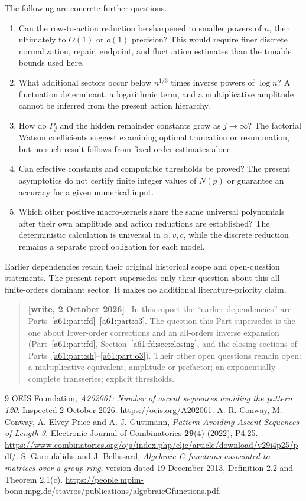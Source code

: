 \documentclass[11pt,letterpaper]{article}
\numberwithin{equation}{section}
\theoremstyle{remark}\newtheorem{remark}[theorem]{Remark}
\newenvironment{writenote}{\par\smallskip\begin{quote}\small\textbf{[write, 2 October 2026]}\ }{\end{quote}\smallskip}
\begin{document}
The following are concrete further questions.
\begin{enumerate}
\item Can the row-to-action reduction be sharpened to smaller
powers of $n$, then ultimately to $O(1)$ or $o(1)$ precision?
This would require finer discrete normalization, repair, endpoint,
and fluctuation estimates than the tunable bounds used here.
\item What additional sectors occur below $n^{1/3}$ times inverse
powers of $\log n$? A fluctuation determinant, a logarithmic term,
and a multiplicative amplitude cannot be inferred from the present
action hierarchy.
\item How do $P_j$ and the hidden remainder constants grow as
$j\to\infty$? The factorial Watson coefficients suggest examining
optimal truncation or resummation, but no such result follows from
fixed-order estimates alone.
\item Can effective constants and computable thresholds be proved?
The present asymptotics do not certify finite integer values of
$N(p)$ or guarantee an accuracy for a given numerical input.
\item Which other positive macro-kernels share the same universal
polynomials after their own amplitude and action reductions are
established? The deterministic calculation is universal in
$\alpha,v,c$, while the discrete reduction remains a separate proof
obligation for each model.
\end{enumerate}
Earlier dependencies retain their original historical scope and
open-question statements. The present report supersedes only their
question about this all-finite-orders dominant sector. It makes no
additional literature-priority claim.
\begin{writenote}
In this report the ``earlier dependencies'' are Parts~\ref{a61:part:fd}--\ref{a61:part:o3}. The question this Part supersedes is the one about lower-order corrections and an all-orders inverse expansion (Part~\ref{a61:part:fd}, Section~\ref{a61:fd:sec:closing}, and the closing sections of Parts~\ref{a61:part:sh}--\ref{a61:part:o3}). Their other open questions remain open: a multiplicative equivalent, amplitude or prefactor; an exponentially complete transseries; explicit thresholds.
\end{writenote}



\begin{thebibliography}{9}
\small
{} OEIS Foundation, \emph{A202061: Number of ascent sequences avoiding the pattern 120}. Inspected 2 October 2026. \url{https://oeis.org/A202061}.
 A. R. Conway, M. Conway, A. Elvey Price and A. J. Guttmann, \emph{Pattern-Avoiding Ascent Sequences of Length 3}, Electronic Journal of Combinatorics \textbf{29}(4) (2022), P4.25. \url{https://www.combinatorics.org/ojs/index.php/eljc/article/download/v29i4p25/pdf/}.
 S. Garoufalidis and J. Bellissard, \emph{Algebraic G-functions associated to matrices over a group-ring}, version dated 19 December 2013, Definition 2.2 and Theorem 2.1(c). \url{https://people.mpim-bonn.mpg.de/stavros/publications/algebraicGfunctions.pdf}.
\end{thebibliography}
\end{document}
